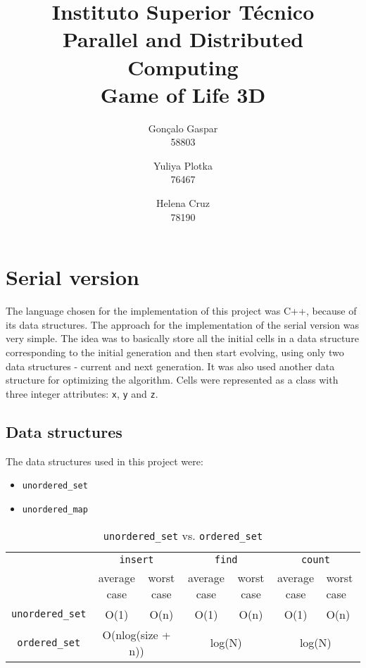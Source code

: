 \documentclass[11pt,english]{article}
\author{
\begin{tabular}{c}
    Gonçalo Gaspar \\
    58803
\end{tabular}
    \and
\begin{tabular}{c}
    Yuliya Plotka \\ 
    76467
\end{tabular}
    \and
\begin{tabular}{c}
    Helena Cruz \\ 
    78190
\end{tabular}
\vspace{0.01cm}
}
\title{
    \vspace{-2cm}
    \large Instituto Superior Técnico \\
    \Large Parallel and Distributed Computing \\
    \medbreak
    \LARGE  Game of Life 3D
}
\date{\vspace{-5ex}}
\begin{document}
\maketitle


\section{Serial version}

The language chosen for the implementation of this project was C++, because of 
its data structures.
The approach for the implementation of the serial version was very simple. The 
idea was to basically store all the initial cells in a data structure 
corresponding to the initial generation and then start evolving, using only two
data structures - current and next generation. It was also used another data 
structure for optimizing the algorithm. 
Cells were represented as a class with three integer attributes: \texttt{x}, 
\texttt{y} and \texttt{z}. 

\subsection{Data structures}

The data structures used in this project were:

\begin{itemize}
    \item \texttt{unordered\_set}
    \item \texttt{unordered\_map}
\end{itemize}

\begin{table}[]
\centering
\begin{tabular}{|c|c|c|c|c|c|l|}
\hline
\multirow{2}{*}{}          & \multicolumn{2}{c|}{\texttt{insert}}   & \multicolumn{2}{c|}{\texttt{find}}           & \multicolumn{2}{c|}{\texttt{count}}  \\ \cline{2-7} 
                           & average case        & worst case       & average case  & worst case  & average case   & worst case \\ \hline
\texttt{unordered\_set}    & O(1)                & O(n)             & O(1)          & O(n)        & O(1)           & O(n)       \\ \hline
\texttt{ordered\_set}      & \multicolumn{2}{c|}{O(nlog(size + n))} & \multicolumn{2}{c|}{log(N)} & \multicolumn{2}{c|}{log(N)} \\ \hline
\end{tabular}
\caption{\texttt{unordered\_set} vs. \texttt{ordered\_set}}
\label{table:unordered_vs_ordered}
\end{table}
\end{document}
